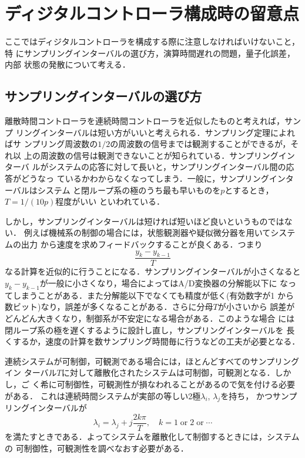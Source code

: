 \chapter{ディジタルコントローラ構成時の留意点}
ここではディジタルコントローラを構成する際に注意しなければいけないこと，特
にサンプリングインターバルの選び方，演算時間遅れの問題，量子化誤差，内部
状態の発散について考える．
\section{サンプリングインターバルの選び方}
離散時間コントローラを連続時間コントローラを近似したものと考えれば，サンプ
リングインターバルは短い方がいいと考えられる．サンプリング定理によればサ
ンプリング周波数の$1/2$の周波数の信号までは観測することができるが，それ以
上の周波数の信号は観測できないことが知られている．サンプリングインターバ
ルがシステムの応答に対して長いと，サンプリングインターバル間の応答がどうなっ
ているかわからなくなってしまう．一般に，サンプリングインターバルはシステム
と閉ループ系の極のうち最も早いものを$p$とするとき，$T=1/(10 p)$程度がいい
といわれている．

しかし，サンプリングインターバルは短ければ短いほど良いというものではない．
例えば機械系の制御の場合には，状態観測器や疑似微分器を用いてシステムの出力
から速度を求めフィードバックすることが良くある．つまり
\begin{equation}
 \frac{y_{k} - y_{k-1}}{T}
\end{equation}
なる計算を近似的に行うことになる．サンプリングインターバルが小さくなると
$y_k - y_{k-1}$が一般に小さくなり，場合によってはA/D変換器の分解能以下に
なってしまうことがある．また分解能以下でなくても精度が低く(有効数字が1
から数ビット)なり，誤差が多くなることがある．さらに分母$T$が小さいから
誤差がどんどん大きくなり，制御系が不安定になる場合がある．このような場合
には閉ループ系の極を遅くするように設計し直し，サンプリングインターバルを
長くするか，速度の計算を数サンプリング時間毎に行うなどの工夫が必要となる．

連続システムが可制御，可観測である場合には，ほとんどすべてのサンプリングイン
ターバル$T$に対して離散化されたシステムは可制御，可観測となる．しかし，ご
く希に可制御性，可観測性が損なわれることがあるので気を付ける必要がある．
これは連続時間システムが実部の等しい2極$\lambda_i$, $\lambda_j$を持ち，
かつサンプリングインターバルが
\begin{equation}
 \lambda_i = \lambda_j + j \frac{2k \pi}{T}, \quad
  k = 1 \; \mbox{or} \; 2 \; \mbox{or} \; \cdots
\end{equation}
を満たすときである．よってシステムを離散化して制御するときには，システムの
可制御性，可観測性を調べなおす必要がある．

